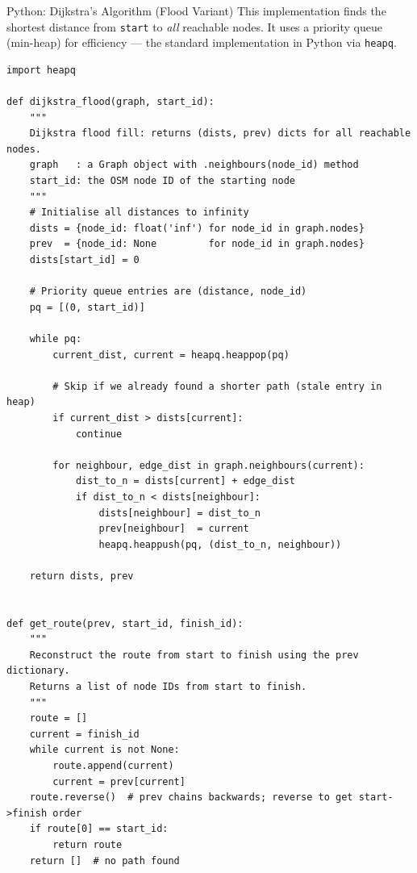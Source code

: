 \documentclass[aspectratio=169,10pt]{beamer}
\begin{document}
\begin{frame}[fragile]{Python: Dijkstra's Algorithm (Flood Variant)}
  This implementation finds the shortest distance from \texttt{start} to
  \emph{all} reachable nodes.  It uses a priority queue (min-heap) for
  efficiency --- the standard implementation in Python via
  \texttt{heapq}.

\begin{lstlisting}[style=pythoncode]
import heapq

def dijkstra_flood(graph, start_id):
    """
    Dijkstra flood fill: returns (dists, prev) dicts for all reachable nodes.
    graph   : a Graph object with .neighbours(node_id) method
    start_id: the OSM node ID of the starting node
    """
    # Initialise all distances to infinity
    dists = {node_id: float('inf') for node_id in graph.nodes}
    prev  = {node_id: None         for node_id in graph.nodes}
    dists[start_id] = 0

    # Priority queue entries are (distance, node_id)
    pq = [(0, start_id)]

    while pq:
        current_dist, current = heapq.heappop(pq)

        # Skip if we already found a shorter path (stale entry in heap)
        if current_dist > dists[current]:
            continue

        for neighbour, edge_dist in graph.neighbours(current):
            dist_to_n = dists[current] + edge_dist
            if dist_to_n < dists[neighbour]:
                dists[neighbour] = dist_to_n
                prev[neighbour]  = current
                heapq.heappush(pq, (dist_to_n, neighbour))

    return dists, prev


def get_route(prev, start_id, finish_id):
    """
    Reconstruct the route from start to finish using the prev dictionary.
    Returns a list of node IDs from start to finish.
    """
    route = []
    current = finish_id
    while current is not None:
        route.append(current)
        current = prev[current]
    route.reverse()  # prev chains backwards; reverse to get start->finish order
    if route[0] == start_id:
        return route
    return []  # no path found
\end{lstlisting}
\end{frame}
\end{document}
